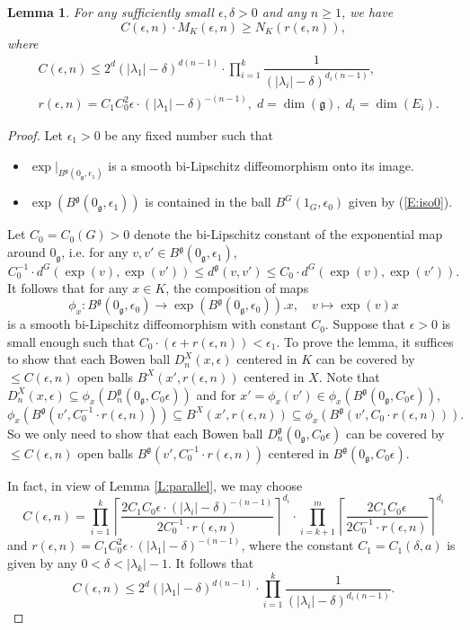 \documentclass[reqno,12pt]{amsart}
\newtheorem{lemma}[theorem]{Lemma}
\theoremstyle{definition}
\numberwithin{equation}{section}
\newcommand{\Lg}{\mathfrak{g}}
\begin{document}
{\begin{lemma}
    For any sufficiently small $\epsilon,\delta>0$ and any $n\geq 1$, we have $$C(\epsilon,n)\cdot M_K(\epsilon,n)\geq N_K(r(\epsilon,n)),$$ where 
    \begin{equation*}
        \begin{aligned}
&C(\epsilon,n)\leq 2^d(|\lambda_1|-\delta)^{d(n-1)}\cdot\prod_{i=1}^k\dfrac{1}{(|\lambda_i|-\delta)^{d_i(n-1)}},\\ &r(\epsilon,n)=C_1C_0^2\epsilon\cdot (|\lambda_1|-\delta)^{-(n-1)},\;d=\dim(\Lg),\;d_i=\dim(E_i).
    \end{aligned}
    \end{equation*}
\end{lemma}
\begin{proof}
Let $\epsilon_1>0$ be any fixed number such that
\begin{itemize}
    \item $\exp|_{B^\Lg(0_\Lg,\epsilon_1)}$ is a smooth bi-Lipschitz diffeomorphism onto its image.
    \item $\exp(B^\Lg(0_\Lg,\epsilon_1))$ is contained in the ball $B^G(1_G,\epsilon_0)$ given by (\ref{E:iso0}).
\end{itemize} Let $C_0=C_0(G)>0$ denote the bi-Lipschitz constant of the exponential map around $0_\Lg$, i.e. for any $v,v'\in B^\Lg(0_\Lg,\epsilon_1)$, $$
    C_0^{-1}\cdot d^G(\exp(v),\exp(v'))\leq d^\Lg(v,v')\leq C_0\cdot d^G(\exp(v),\exp(v')).
    $$
    It follows that for any $x\in K$, the composition of maps $$
    \phi_x: B^\Lg(0_\Lg,\epsilon_0)\to \exp(B^\Lg(0_\Lg,\epsilon_0)).x,\quad v\mapsto\exp(v)x
    $$
    is a smooth bi-Lipschitz diffeomorphism with constant $C_0$. Suppose that $\epsilon>0$ is small enough such that $C_0\cdot(\epsilon+r(\epsilon,n))<\epsilon_1$. To prove the lemma, it suffices to show that each Bowen ball $D^X_n(x,\epsilon)$ centered in $K$ can be covered by $\leq C(\epsilon,n)$ open balls $B^X(x',r(\epsilon,n))$ centered in $X$. Note that $D^X_n(x,\epsilon)\subseteq \phi_x(D^\Lg_n(0_\Lg,C_0\epsilon))$ and for $x'=\phi_x(v')\in \phi_x(B^\Lg(0_\Lg,C_0\epsilon))$, $$
    \phi_x(B^\Lg(v',C_0^{-1}\cdot r(\epsilon,n)))\subseteq B^X(x',r(\epsilon,n))\subseteq \phi_x(B^\Lg(v',C_0\cdot r(\epsilon,n))).
    $$
    So we only need to show that each Bowen ball $D^\Lg_n(0_\Lg,C_0\epsilon)$ can be covered by $\leq C(\epsilon,n)$ open balls $B^\Lg(v',C_0^{-1}\cdot r(\epsilon,n))$ centered in $B^\Lg(0_\Lg,C_0\epsilon)$.

    In fact, in view of Lemma \ref{L:parallel}, we may choose \begin{equation*}
        C(\epsilon,n)=\prod_{i=1}^k\left\lceil\dfrac{2C_1C_0\epsilon\cdot (|\lambda_i|-\delta)^{-(n-1)}}{2C_0^{-1}\cdot r(\epsilon,n)}\right\rceil^{d_i}\cdot \prod_{i=k+1}^m\left\lceil\dfrac{2C_1C_0\epsilon}{2C_0^{-1}\cdot r(\epsilon,n)}\right\rceil^{d_i}
    \end{equation*}
    and $r(\epsilon,n)=C_1C_0^2\epsilon\cdot (|\lambda_1|-\delta)^{-(n-1)}$, where the constant $C_1=C_1(\delta,a)$ is given by any $0<\delta<|\lambda_k|-1$. It follows that $$
    C(\epsilon,n)\leq 2^d(|\lambda_1|-\delta)^{d(n-1)}\cdot\prod_{i=1}^k\dfrac{1}{(|\lambda_i|-\delta)^{d_i(n-1)}}.
    $$
\end{proof}

}
\end{document}
